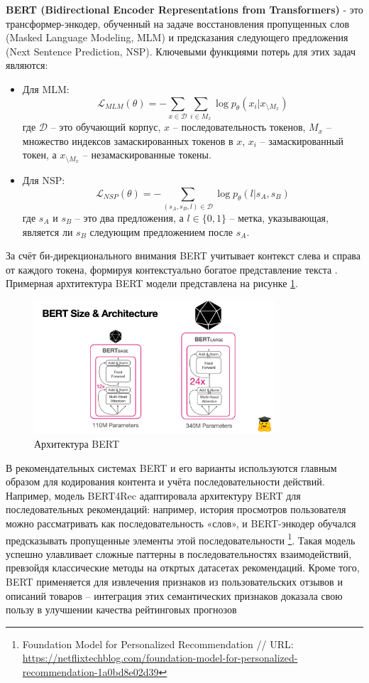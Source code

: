 \textbf{BERT (Bidirectional Encoder Representations from Transformers)} -  это трансформер-энкодер, обученный на задаче восстановления пропущенных слов (Masked Language Modeling, MLM) и предсказания следующего предложения (Next Sentence Prediction, NSP). Ключевыми функциями потерь для этих задач являются:
\begin{itemize}
    \item Для MLM:
    \[ \mathcal{L}_{MLM}(\theta) = - \sum_{x \in \mathcal{D}} \sum_{i \in M_x} \log p_\theta(x_i | x_{\setminus M_x}) \]
    где \(\mathcal{D}\) – это обучающий корпус, \(x\) – последовательность токенов, \(M_x\) – множество индексов замаскированных токенов в \(x\), \(x_i\) – замаскированный токен, а \(x_{\setminus M_x}\) – незамаскированные токены.
    \item Для NSP:
    \[ \mathcal{L}_{NSP}(\theta) = - \sum_{(s_A, s_B, l) \in \mathcal{D}} \log p_\theta(l | s_A, s_B) \]
    где \(s_A\) и \(s_B\) – это два предложения, а \(l \in \{0, 1\}\) – метка, указывающая, является ли \(s_B\) следующим предложением после \(s_A\).
\end{itemize}
За счёт би-дирекционального внимания BERT учитывает контекст слева и справа от каждого токена, формируя контекстуально богатое представление текста \citep{devlin2019bert}. Примерная архтитектура BERT модели представлена на рисунке \ref{fig:bert_architecture}.

\begin{figure}[H]
    \centering
    \includegraphics[width=0.8\textwidth]{images/bert.png}
    \caption{Архитектура BERT}
    \label{fig:bert_architecture}
\end{figure}

В рекомендательных системах BERT и его варианты используются главным образом для кодирования контента и учёта последовательности действий. Например, модель BERT4Rec \citep{sun2019bert4rec} адаптировала архитектуру BERT для последовательных рекомендаций: например, история просмотров пользователя можно рассматривать как последовательность «слов», и BERT-энкодер обучался предсказывать пропущенные элементы этой последовательности \footnote{Foundation Model for Personalized Recommendation // URL: \url{https://netflixtechblog.com/foundation-model-for-personalized-recommendation-1a0bd8e02d39}}. Такая модель успешно улавливает сложные паттерны в последовательностях взаимодействий, превзойдя классические методы на откртых датасетах рекомендаций. Кроме того, BERT применяется для извлечения признаков из пользовательских отзывов и описаний товаров – интеграция этих семантических признаков доказала свою пользу в улучшении качества рейтинговых прогнозов



